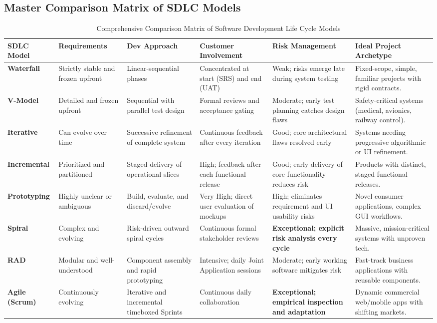 \subsection{Master Comparison Matrix of SDLC Models}
\begin{table}[htbp]
\centering
\scriptsize
\caption{Comprehensive Comparison Matrix of Software Development Life Cycle Models}
\label{tab:sdlc_master_matrix}
\begin{tabularx}{\textwidth}{l p{2.2cm} p{2.2cm} p{2.4cm} p{2.4cm} X}
\toprule
\textbf{SDLC Model} & \textbf{Requirements} & \textbf{Dev Approach} & \textbf{Customer Involvement} & \textbf{Risk Management} & \textbf{Ideal Project Archetype} \\
\midrule
\textbf{Waterfall} & Strictly stable and frozen upfront & Linear-sequential phases & Concentrated at start (SRS) and end (UAT) & Weak; risks emerge late during system testing & Fixed-scope, simple, familiar projects with rigid contracts. \\
\textbf{V-Model} & Detailed and frozen upfront & Sequential with parallel test design & Formal reviews and acceptance gating & Moderate; early test planning catches design flaws & Safety-critical systems (medical, avionics, railway control). \\
\textbf{Iterative} & Can evolve over time & Successive refinement of complete system & Continuous feedback after every iteration & Good; core architectural flaws resolved early & Systems needing progressive algorithmic or UI refinement. \\
\textbf{Incremental} & Prioritized and partitioned & Staged delivery of operational slices & High; feedback after each functional release & Good; early delivery of core functionality reduces risk & Products with distinct, staged functional releases. \\
\textbf{Prototyping} & Highly unclear or ambiguous & Build, evaluate, and discard/evolve & Very High; direct user evaluation of mockups & High; eliminates requirement and UI usability risks & Novel consumer applications, complex GUI workflows. \\
\textbf{Spiral} & Complex and evolving & Risk-driven outward spiral cycles & Continuous formal stakeholder reviews & \textbf{Exceptional; explicit risk analysis every cycle} & Massive, mission-critical systems with unproven tech. \\
\textbf{RAD} & Modular and well-understood & Component assembly and rapid prototyping & Intensive; daily Joint Application sessions & Moderate; early working software mitigates risk & Fast-track business applications with reusable components. \\
\textbf{Agile (Scrum)} & Continuously evolving & Iterative and incremental timeboxed Sprints & Continuous daily collaboration & \textbf{Exceptional; empirical inspection and adaptation} & Dynamic commercial web/mobile apps with shifting markets. \\
\bottomrule
\end{tabularx}
\end{table}

